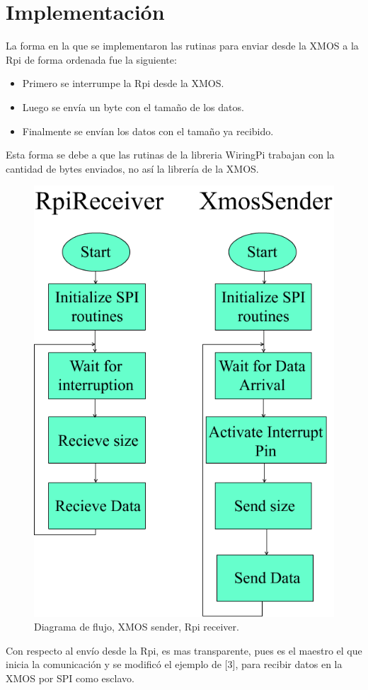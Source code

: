\documentclass{article}
\begin{document}
\section{Implementación}
La forma en la que se implementaron las rutinas para enviar desde la XMOS a la Rpi de forma ordenada fue la siguiente:
\begin{itemize}
\item Primero se interrumpe la Rpi desde la XMOS.
\item Luego se envía un byte con el tamaño de los datos.
  \item Finalmente se envían los datos con el tamaño ya recibido.
\end{itemize}
Esta forma se debe a que las rutinas de la libreria WiringPi trabajan con la cantidad de bytes enviados, no así la librería de la XMOS.
\begin{figure}[ht!]\centering
\includegraphics[scale=0.34]{./diag.png}
\caption{Diagrama de flujo, XMOS sender, Rpi receiver.}
\label{fig:top}
\end{figure}
Con respecto al envío desde la Rpi, es mas transparente, pues es el maestro el que inicia la comunicación y se modificó el ejemplo de [3], para recibir datos en la XMOS por SPI como esclavo.\newpage
\end{document}
